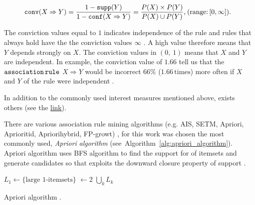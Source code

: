 				\begin{equation}
					\label{eqn:conviction}
					{\operatorname{\mathtt{conv}}}(X \Rightarrow Y) = \frac{1 - {\operatorname{\mathtt{supp}}}(Y)}{1 - {\operatorname{\mathtt{conf}}}(X \Rightarrow Y)} = \frac{P(X)\times P(Y)}{P(X) \cup P(Y)}\text{,}\:(\text{range:}\,[0,\infty])\text{.}
				\end{equation}
				
		The conviction values equal to $1$ indicates independence of the rule and rules that always hold have the the conviction values $\infty$ \cite{Hahsler2020}. A high value therefore means that $Y$ depends strongly on $X$. The conviction values in $(0,\:1)$ means that $X$ and $Y$ are independent. In example, the conviction value of $1.66$ tell us that the ${\operatorname{\mathtt{association}}}\,{\operatorname{\mathtt{rule}}}$ $X \Rightarrow Y$ would be incorrect $66\%$ ($1.66\,\text{times}$) more often if $X$ and $Y$ of the rule were independent \cite{Hahsler2020}. 
			
		In addition to the commonly used interest measures mentioned above, exists others \cite{Hahsler2020} (see the \href{https://michael.hahsler.net/research/association_rules/measures.html}{link}).
				
			There are various association rule mining algorithms (e.g. AIS, SETM, Apriori, Aprioritid, Apriorihybrid, FP-growt) \cite{Kumbhare2014}, for this work was chosen the most commonly used, \emph{Apriori algorithm} \cite{Agarwal1994} (see~Algorithm~\ref{alg:apriori_algorithm}). Apriori algorithm uses BFS algorithm to find the support for of itemsets and generate candidates so that exploits the downward closure property of support \cite{Agarwal1994}.
		
\begin{algorithm}[H]
	\label{alg:apriori_algorithm}
	\SetAlgoLined

	\BlankLine
	
	$L_1 \leftarrow \{\text{large 1-itemsets}\}$\;
	\K $\leftarrow 2$\;
 	\Return $\bigcup\limits_{k} L_k$
 \caption{Apriori algorithm \cite{Agarwal1994}.}
\end{algorithm}

